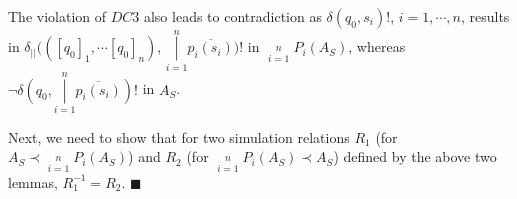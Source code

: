 The violation of $DC3$ also leads to contradiction as $\delta(q_0,
s_i)!$, $i = 1,\cdots, n$, results in $\delta_{||}(([q_0]_1,\cdots
[q_0]_n)$, $\mathop {|}\limits_{i = 1}^n \overline{p_i(s_i)})!$ in
$\mathop {||}\limits_{i = 1}^n P_i(A_S)$, whereas $\neg \delta(q_0,
\mathop {|}\limits_{i = 1}^n \overline{p_i(s_i)})!$ in $A_S$.


%
%
%
%


Next, we need to show that for two simulation relations $R_1$ (for
$A_S \prec \mathop {||}\limits_{i = 1}^n P_i \left( {A_S } \right)$)
and $R_2$ (for $\mathop {||}\limits_{i = 1}^n P_i \left( {A_S }
\right)\prec A_S$) defined by the above two lemmas, $R_1^{-1} =
R_2$. $\blacksquare$


